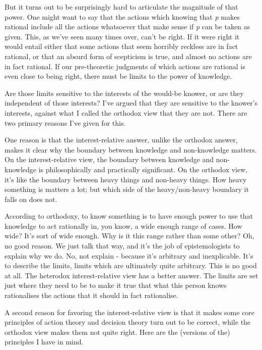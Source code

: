 \documentclass[
  10pt,
  letterpaper,
  twoside]{scrbook}
\begin{document}
But it turns out to be surprisingly hard to articulate the magnitude of
that power. One might want to say that the actions which knowing that
\emph{p} makes rational include all the actions whatsoever that make
sense if \emph{p} can be taken as given. This, as we've seen many times
over, can't be right. If it were right it would entail either that some
actions that seem horribly reckless are in fact rational, or that an
absurd form of scepticism is true, and almost no actions are in fact
rational. If our pre-theoretic judgments of which actions are rational
is even close to being right, there must be limits to the power of
knowledge.

Are those limits sensitive to the interests of the would-be knower, or
are they independent of those interests? I've argued that they are
sensitive to the knower's interests, against what I called the orthodox
view that they are not. There are two primary reasons I've given for
this.

One reason is that the interest-relative answer, unlike the orthodox
answer, makes it clear why the boundary between knowledge and
non-knowledge matters. On the interest-relative view, the boundary
between knowledge and non-knowledge is philosophically and practically
significant. On the orthodox view, it's like the boundary between heavy
things and non-heavy things. How heavy something is matters a lot; but
which side of the heavy/non-heavy boundary it falls on does not.

According to orthodoxy, to know something is to have enough power to use
that knowledge to act rationally in, you know, a wide enough range of
cases. How wide? It's sort of wide enough. Why is it this range rather
than some other? Oh, no good reason. We just talk that way, and it's the
job of epistemologists to explain why we do. No, not explain - because
it's arbitrary and inexplicable. It's to describe the limits, limits
which are ultimately quite arbitrary. This is no good at all. The
heterodox interest-relative view has a better answer. The limits are set
just where they need to be to make it true that what this person knows
rationalises the actions that it should in fact rationalise.

A second reason for favoring the interest-relative view is that it makes
some core principles of action theory and decision theory turn out to be
correct, while the orthodox view makes them not quite right. Here are
the (versions of the) principles I have in mind.
\end{document}
